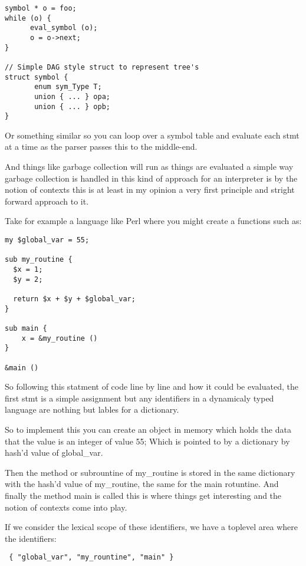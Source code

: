 \documentclass[defaultstyle,11pt]{article}
\begin{document}
\begin{lstlisting}
symbol * o = foo;
while (o) {
      eval_symbol (o);
      o = o->next;
}

// Simple DAG style struct to represent tree's
struct symbol {
       enum sym_Type T;
       union { ... } opa;
       union { ... } opb;
}
\end{lstlisting}

Or something similar so you can loop over a symbol table and evaluate each stmt at a time as the
parser passes this to the middle-end.

And things like garbage collection will run as things are evaluated a simple way garbage collection
is handled in this kind of approach for an interpreter is by the notion of contexts this is at least
in my opinion a very first principle and stright forward approach to it.

Take for example a language like Perl where you might create a functions such as:

\begin{lstlisting}
my $global_var = 55;

sub my_routine {
  $x = 1;
  $y = 2;

  return $x + $y + $global_var;
}

sub main {
    x = &my_routine ()
}

&main ()
\end{lstlisting}

So following this statment of code line by line and how it could be evaluated, the first stmt is a
simple assignment but any identifiers in a dynamicaly typed language are nothing but lables for a
dictionary.

So to implement this you can create an object in memory which holds the data that the value is an
integer of value 55; Which is pointed to by a dictionary by hash'd value of global\_var.

Then the method or subrountine of my\_routine is stored in the same dictionary with the hash'd value
of my\_routine, the same for the main rotuntine. And finally the method main is called this is where
things get interesting and the notion of contexts come into play.

If we consider the lexical scope of these identifiers, we have a toplevel area where the identifiers:

\begin{lstlisting}
 { "global_var", "my_rountine", "main" }
\end{lstlisting}
\end{document}

